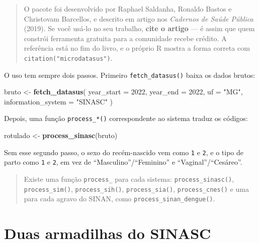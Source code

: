 \documentclass[
]{book}
\newenvironment{Shaded}{\begin{snugshade}}{\end{snugshade}}
\newcommand{\AttributeTok}[1]{\textcolor[rgb]{0.13,0.29,0.53}{#1}}
\newcommand{\DecValTok}[1]{\textcolor[rgb]{0.00,0.00,0.81}{#1}}
\newcommand{\FunctionTok}[1]{\textcolor[rgb]{0.13,0.29,0.53}{\textbf{#1}}}
\newcommand{\NormalTok}[1]{#1}
\newcommand{\OtherTok}[1]{\textcolor[rgb]{0.56,0.35,0.01}{#1}}
\newcommand{\StringTok}[1]{\textcolor[rgb]{0.31,0.60,0.02}{#1}}
\begin{document}
\begin{quote}
O pacote foi desenvolvido por Raphael Saldanha, Ronaldo Bastos e Christovam Barcellos, e descrito em artigo nos \emph{Cadernos de Saúde Pública} (2019). Se você usá-lo no seu trabalho, \textbf{cite o artigo} --- é assim que quem constrói ferramenta gratuita para a comunidade recebe crédito. A referência está no fim do livro, e o próprio R mostra a forma correta com \texttt{citation("microdatasus")}.
\end{quote}

O uso tem sempre dois passos. Primeiro \texttt{fetch\_datasus()} baixa os dados brutos:

\begin{Shaded}
\begin{Highlighting}[]
\NormalTok{bruto }\OtherTok{\textless{}{-}} \FunctionTok{fetch\_datasus}\NormalTok{(}
  \AttributeTok{year\_start =} \DecValTok{2022}\NormalTok{,}
  \AttributeTok{year\_end   =} \DecValTok{2022}\NormalTok{,}
  \AttributeTok{uf         =} \StringTok{"MG"}\NormalTok{,}
  \AttributeTok{information\_system =} \StringTok{"SINASC"}
\NormalTok{)}
\end{Highlighting}
\end{Shaded}

Depois, uma função \texttt{process\_*()} correspondente ao sistema traduz os códigos:

\begin{Shaded}
\begin{Highlighting}[]
\NormalTok{rotulado }\OtherTok{\textless{}{-}} \FunctionTok{process\_sinasc}\NormalTok{(bruto)}
\end{Highlighting}
\end{Shaded}

Sem esse segundo passo, o sexo do recém-nascido vem como \texttt{1} e \texttt{2}, e o tipo de parto como \texttt{1} e \texttt{2}, em vez de ``Masculino''/``Feminino'' e ``Vaginal''/``Cesáreo''.

\begin{quote}
Existe uma função \texttt{process\_} para cada sistema: \texttt{process\_sinasc()}, \texttt{process\_sim()}, \texttt{process\_sih()}, \texttt{process\_sia()}, \texttt{process\_cnes()} e uma para cada agravo do SINAN, como \texttt{process\_sinan\_dengue()}.
\end{quote}

\section{Duas armadilhas do SINASC}\label{duas-armadilhas-do-sinasc}
\end{document}
